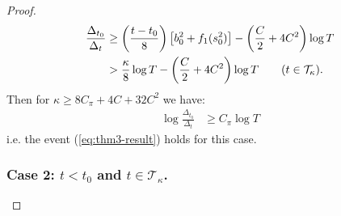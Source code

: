 \begin{proof}
\begin{align*}
    \frac{\Delta_{t_0}}{\Delta_t} &\geq \left(\frac{t-t_0}{8}\right)\left[b_0^2 + f_1(s_0^2)\right]- \left(\frac{C}{2} + 4C^2\right)\log T \\
    &> \frac{\kappa}{8}\log T - \left(\frac{C}{2} + 4C^2\right)\log T \tag{$t \in \mathcal{T}_\kappa$}. 
\end{align*}
Then for $\kappa \geq 8C_\pi + 4C + 32C^2$ we have:
\begin{align*}
    \log \frac{\Delta_{t_0}}{\Delta_t} &\geq C_\pi \log T
\end{align*}
i.e. the event (\ref{eq:thm3-result}) holds for this case. 

\subsubsection*{Case 2: $t < t_0$ and $t\in\mathcal{T}_\kappa$.}


\end{proof}

